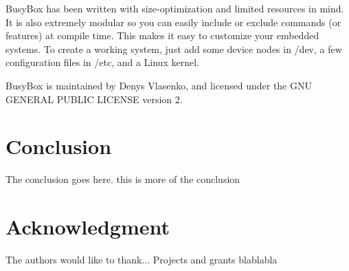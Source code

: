 \documentclass[10pt, conference, compsocconf]{IEEEtran}
\begin{document}
BusyBox has been written with size-optimization and limited resources in mind. It is also extremely modular so you can easily include or exclude commands (or features) at compile time. This makes it easy to customize your embedded systems. To create a working system, just add some device nodes in /dev, a few configuration files in /etc, and a Linux kernel.

BusyBox is maintained by Denys Vlasenko, and licensed under the GNU GENERAL PUBLIC LICENSE version 2.

\section{Conclusion}
The conclusion goes here. this is more of the conclusion





\section*{Acknowledgment}
The authors would like to thank...
Projects and grants blablabla



%
%
%




\end{document}
